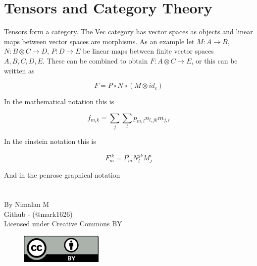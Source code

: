 \documentclass[statementpaper,oneside,article,14pt]{memoir}
\begin{document}
\vfill


\newpage
\section{Tensors and Category Theory}

Tensors form a category. The Vec category has vector spaces as objects and linear maps between vector spaces are morphisms. As an example let $M: A \to B$, $N: B \otimes C \to D$, $P: D \to E$ be linear maps between finite vector spaces $A, B, C, D, E$. These can be combined to obtain $F: A \otimes C \to E$, or this can be written as

$$
F = P \circ N \circ (M \otimes id_c)
$$

In the mathematical notation this is

$$
f_{m_ik} = \sum_j \sum_l p_{m,l} n_{l,jk} m_{j,i}
$$

In the einstein notation this is

$$
F_m^{ik} = P_m^l N_l^{jk} M_j^i
$$

And in the penrose graphical notation

\begin{center}
\end{center}



\newpage

\centering

\section{}

\vfill

By Nimalan M \\
Github - (@mark1626) \\

Licensed under Creative Commons BY

\begin{figure}[htp]
  \centering
  \includegraphics[width=4cm]{cc_by}
  \label{fig:cc}
\end{figure}

\vfill
\end{document}
